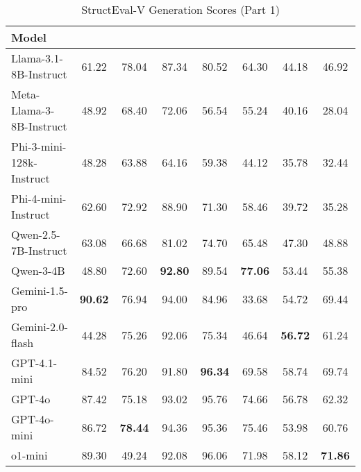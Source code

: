 \begin{table*}[ht]
\centering
\scriptsize
\label{tab:structeval_v_gen_a}
\begin{tabular*}{\textwidth}{@{\extracolsep{\fill}}l*{7}{S[table-format=3.2]}}
\toprule
\textbf{Model} &
 &  &
   &   &
&   &
\\
\midrule
Llama-3.1-8B-Instruct   & 61.22 & 78.04 & 87.34 & 80.52 & 64.30 & 44.18 & 46.92 \\
Meta-Llama-3-8B-Instruct& 48.92 & 68.40 & 72.06 & 56.54 & 55.24 & 40.16 & 28.04 \\
Phi-3-mini-128k-Instruct& 48.28 & 63.88 & 64.16 & 59.38 & 44.12 & 35.78 & 32.44 \\
Phi-4-mini-Instruct      & 62.60 & 72.92 & 88.90 & 71.30 & 58.46 & 39.72 & 35.28 \\
Qwen-2.5-7B-Instruct     & 63.08 & 66.68 & 81.02 & 74.70 & 65.48 & 47.30 & 48.88 \\
Qwen-3-4B              & 48.80 & 72.60 & \textbf{92.80} & 89.54 & \textbf{77.06} & 53.44 & 55.38 \\
Gemini-1.5-pro         & \textbf{90.62} & 76.94 & 94.00 & 84.96 & 33.68 & 54.72 & 69.44 \\
Gemini-2.0-flash       & 44.28 & 75.26 & 92.06 & 75.34 & 46.64 & \textbf{56.72} & 61.24 \\
GPT-4.1-mini           & 84.52 & 76.20 & 91.80 & \textbf{96.34} & 69.58 & 58.74 & 69.74 \\
GPT-4o                 & 87.42 & 75.18 & 93.02 & 95.76 & 74.66 & 56.78 & 62.32 \\
GPT-4o-mini            & 86.72 & \textbf{78.44} & 94.36 & 95.36 & 75.46 & 53.98 & 60.76 \\
o1-mini                & 89.30 & 49.24 & 92.08 & 96.06 & 71.98 & 58.12 & \textbf{71.86} \\
\bottomrule
\end{tabular*}
\caption{StructEval-V Generation Scores (Part 1)}
\end{table*}

